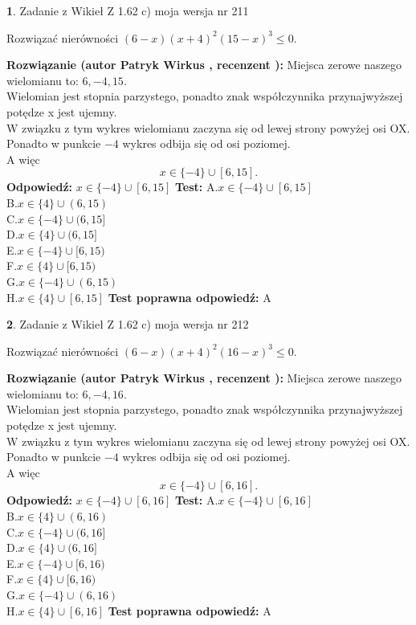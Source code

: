 \documentclass[12pt, a4paper]{article}
\theoremstyle{definition} %
\newtheorem{zad}{}
\newcommand{\zadStart}[1]{\begin{zad}#1\newline}
\newcommand{\zadStop}{\end{zad}}
\newcommand{\rozwStart}[2]{\noindent \textbf{Rozwiązanie (autor #1 , recenzent #2): }\newline}
\newcommand{\rozwStop}{\newline}
\newcommand{\odpStart}{\noindent \textbf{Odpowiedź:}\newline}
\newcommand{\odpStop}{\newline}
\newcommand{\testStart}{\noindent \textbf{Test:}\newline}
\newcommand{\testStop}{\newline}
\newcommand{\kluczStart}{\noindent \textbf{Test poprawna odpowiedź:}\newline}
\newcommand{\kluczStop}{\newline}
\begin{document}
\zadStart{Zadanie z Wikieł Z 1.62 c) moja wersja nr 211}

Rozwiązać nierówności $(6-x)(x+4)^{2}(15-x)^{3}\le0$.
\zadStop
\rozwStart{Patryk Wirkus}{}
Miejsca zerowe naszego wielomianu to: $6, -4, 15$.\\
Wielomian jest stopnia parzystego, ponadto znak współczynnika przy\linebreak najwyższej potędze x jest ujemny.\\ W związku z tym wykres wielomianu zaczyna się od lewej strony powyżej osi OX.\\
Ponadto w punkcie $-4$ wykres odbija się od osi poziomej.\\
A więc $$x \in \{-4\} \cup [6,15].$$
\rozwStop
\odpStart
$x \in \{-4\} \cup [6,15]$
\odpStop
\testStart
A.$x \in \{-4\} \cup [6,15]$\\
B.$x \in \{4\} \cup (6,15)$\\
C.$x \in \{-4\} \cup (6,15]$\\
D.$x \in \{4\} \cup (6,15]$\\
E.$x \in \{-4\} \cup [6,15)$\\
F.$x \in \{4\} \cup [6,15)$\\
G.$x \in \{-4\} \cup (6,15)$\\
H.$x \in \{4\} \cup [6,15]$
\testStop
\kluczStart
A
\kluczStop



\zadStart{Zadanie z Wikieł Z 1.62 c) moja wersja nr 212}

Rozwiązać nierówności $(6-x)(x+4)^{2}(16-x)^{3}\le0$.
\zadStop
\rozwStart{Patryk Wirkus}{}
Miejsca zerowe naszego wielomianu to: $6, -4, 16$.\\
Wielomian jest stopnia parzystego, ponadto znak współczynnika przy\linebreak najwyższej potędze x jest ujemny.\\ W związku z tym wykres wielomianu zaczyna się od lewej strony powyżej osi OX.\\
Ponadto w punkcie $-4$ wykres odbija się od osi poziomej.\\
A więc $$x \in \{-4\} \cup [6,16].$$
\rozwStop
\odpStart
$x \in \{-4\} \cup [6,16]$
\odpStop
\testStart
A.$x \in \{-4\} \cup [6,16]$\\
B.$x \in \{4\} \cup (6,16)$\\
C.$x \in \{-4\} \cup (6,16]$\\
D.$x \in \{4\} \cup (6,16]$\\
E.$x \in \{-4\} \cup [6,16)$\\
F.$x \in \{4\} \cup [6,16)$\\
G.$x \in \{-4\} \cup (6,16)$\\
H.$x \in \{4\} \cup [6,16]$
\testStop
\kluczStart
A
\kluczStop
\end{document}
